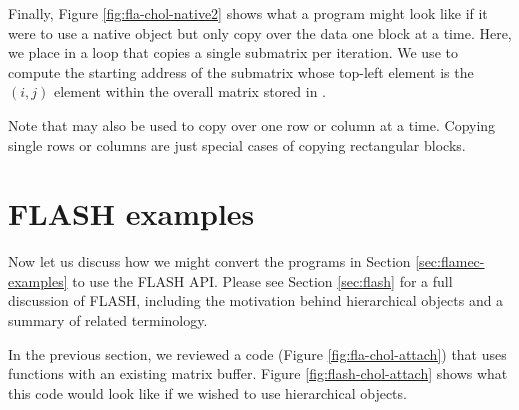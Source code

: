 Finally, Figure \ref{fig:fla-chol-native2} shows what a program might look
like if it were to use a native \libflame object but only copy over the data
one block at a time.
Here, we place \flacopybuffertoobject in a loop that copies a single
submatrix per iteration.
We use \flasubmatrixat to compute the starting address of the submatrix
whose top-left element is the $ (i,j) $ element within the overall matrix
stored in \bufferns.

Note that \flacopybuffertoobject may also be used to copy over one
row or column at a time.
Copying single rows or columns are just special cases of copying rectangular
blocks.




\section{FLASH examples}
\label{sec:flash-examples}

Now let us discuss how we might convert the \libflame programs in
Section \ref{sec:flamec-examples} to use the FLASH API.
Please see Section \ref{sec:flash} for a full discussion of FLASH, including
the motivation behind hierarchical objects and a summary of related
terminology.


In the previous section, we reviewed a code (Figure \ref{fig:fla-chol-attach})
that uses \libflame functions with an existing matrix buffer.
Figure \ref{fig:flash-chol-attach} shows what this code would look like
if we wished to use hierarchical objects.

